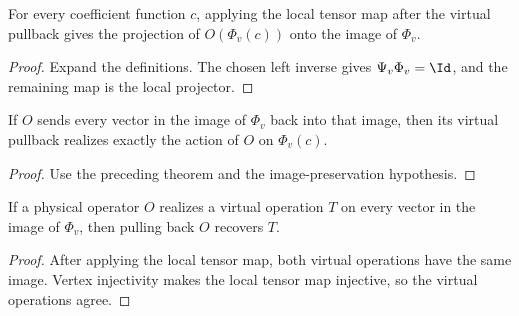 \begin{theorem}%
    \label{thm:peps_localVirtualOpOfPhysicalOp_spec}
    \leanok
    For every coefficient function $c$, applying the local tensor map after
    the virtual pullback gives the projection of $O(\Phi_v(c))$ onto the
    image of $\Phi_v$.
\end{theorem}
\begin{proof}\leanok
    Expand the definitions. The chosen left inverse gives
    $\Psi_v\Phi_v=\Id$, and the remaining map is the local projector.
\end{proof}

\begin{theorem}%
    \label{thm:peps_localVirtualOpOfPhysicalOp_realizes_of_projector}
    \leanok
    If $O$ sends every vector in the image of $\Phi_v$ back into that image,
    then its virtual pullback realizes exactly the action of $O$ on
    $\Phi_v(c)$.
\end{theorem}
\begin{proof}\leanok
    Use the preceding theorem and the image-preservation hypothesis.
\end{proof}

\begin{theorem}%
    \label{thm:peps_localVirtualOpOfPhysicalOp_eq_of_realizes}
    \leanok
    If a physical operator $O$ realizes a virtual operation $T$ on every
    vector in the image of $\Phi_v$, then pulling back $O$ recovers $T$.
\end{theorem}
\begin{proof}\leanok
    After applying the local tensor map, both virtual operations have the same
    image. Vertex injectivity makes the local tensor map injective, so the
    virtual operations agree.
\end{proof}


